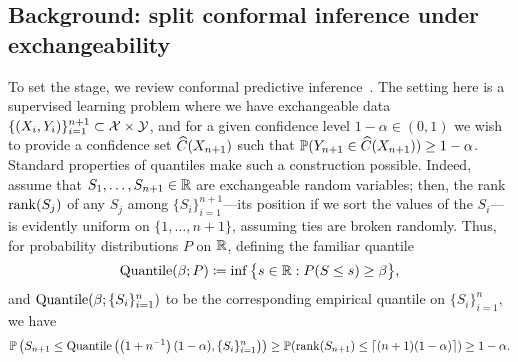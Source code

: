 \subsection{Background: split conformal
  inference under exchangeability}
\label{sec:split-conformal-intro}

To set the stage, we review conformal predictive
inference~\cite{VovkGaSh05, LeiGSRiTiWa18}.
The setting here is a supervised learning problem where we have exchangeable
data $\{ (X_i, Y_i) \}_{i = 1}^{n+1} \subset \mathcal{X} \times \mathcal{Y}$, and for
a given confidence level $1-\alpha \in (0, 1)$ we wish to provide a confidence
set $\widehat{C}(X_{n+1})$ such that $\mathbb{P}(Y_{n + 1} \in \widehat{C}(X_{n+1})) \ge 1 -
\alpha$. Standard properties of quantiles make such a construction
possible. Indeed, assume that $S_1, \ldots, S_{n+1} \in \mathbb{R}$ are exchangeable
random variables; then, the rank $\mathop{\rm rank}(S_j)$ of any $S_j$ among
$\{S_i\}_{i=1}^{n+1}$---its position if we sort the values of the $S_i$---is
evidently uniform on $\{1, \ldots, n+1\}$, assuming ties are broken
randomly.  Thus, for probability distributions $P$ on $\mathbb{R}$, defining the
familiar quantile
\begin{equation}
  \textup{Quantile}(\beta; P)
  \coloneqq \inf \big\{ s \in \mathbb{R} : P(S \leq s) \geq \beta \big\},
  \label{eqn:quantile-defn}
\end{equation}
and $\textup{Quantile}(\beta; \{S_i\}_{i=1}^n)$ to be the corresponding
empirical quantile on $\{S_i\}_{i=1}^n$, we have
\begin{equation*}
\mathbb{P}\left(S_{n+1} \le \textup{Quantile}\left(\left(1 + n^{-1}\right)
(1 - \alpha), \{S_i\}_{i=1}^n\right)\right)  \ge \mathbb{P}( \mathop{\rm rank}(S_{n+1}) \le  \left\lceil{(n+1)(1-\alpha)}\right\rceil) \ge 1 - \alpha.
\end{equation*}


